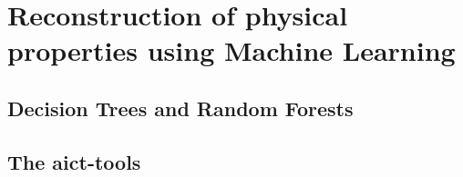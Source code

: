 \chapter{Reconstruction of physical properties using Machine Learning}

\section{Decision Trees and Random Forests}


\section{The aict-tools}